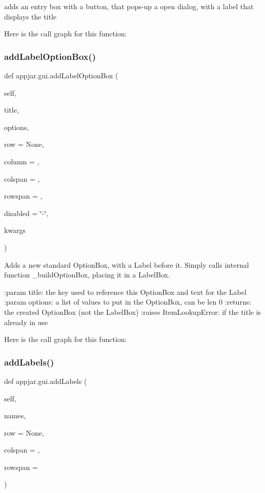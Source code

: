 \begin{DoxyVerb}adds an entry box with a button, that pops-up a open dialog, with a label that displays the title \end{DoxyVerb}
 Here is the call graph for this function\+:
\mbox{\label{classappjar_1_1gui_a53643139f8d07a9a43d7aafee7d6337e}} 
\subsubsection{\texorpdfstring{add\+Label\+Option\+Box()}{addLabelOptionBox()}}
{\footnotesize\ttfamily def appjar.\+gui.\+add\+Label\+Option\+Box (\begin{DoxyParamCaption}\item[{}]{self,  }\item[{}]{title,  }\item[{}]{options,  }\item[{}]{row = {\ttfamily None},  }\item[{}]{column = {},  }\item[{}]{colspan = {},  }\item[{}]{rowspan = {},  }\item[{}]{disabled = {\ttfamily \char`\"{}-\/\char`\"{}},  }\item[{}]{kwargs }\end{DoxyParamCaption})}

\begin{DoxyVerb}Adds a new standard OptionBox, with a Label before it.
Simply calls internal function _buildOptionBox, placing it in a LabelBox.

:param title: the key used to reference this OptionBox and text for the Label
:param options: a list of values to put in the OptionBox, can be len 0
:returns: the created OptionBox (not the LabelBox)
:raises ItemLookupError: if the title is already in use
\end{DoxyVerb}
 Here is the call graph for this function\+:
\mbox{\label{classappjar_1_1gui_aaf933aa526da74071c15df1794642a96}} 
\subsubsection{\texorpdfstring{add\+Labels()}{addLabels()}}
{\footnotesize\ttfamily def appjar.\+gui.\+add\+Labels (\begin{DoxyParamCaption}\item[{}]{self,  }\item[{}]{names,  }\item[{}]{row = {\ttfamily None},  }\item[{}]{colspan = {},  }\item[{}]{rowspan = {} }\end{DoxyParamCaption})}

